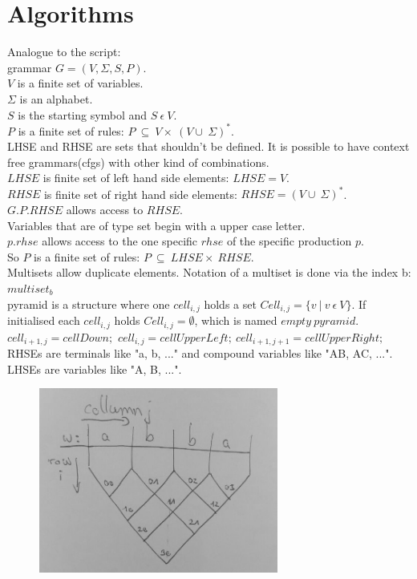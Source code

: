 
\section{Algorithms}\label{algorithms}
\noindent Analogue to the script: \\
grammar $G=(V,\Sigma , S, P)$.\\
$V$ is a finite set of variables. \\
$\Sigma$ is an alphabet. \\
$S$ is the starting symbol and $S\ \epsilon\ V$. \\
$P$ is a finite set of rules: $P\ \subseteq\ V \times\ (V \cup\ \Sigma)^{*}$. \\ 
LHSE and RHSE are sets that shouldn't be defined. It is possible to have context free grammars(cfgs) with other kind of combinations.\\
$LHSE$ is finite set of left hand side elements: $LHSE = V$.\\
$RHSE$ is finite set of right hand side elements: $RHSE = (V \cup\ \Sigma)^{*}$.\\
$G.P.RHSE$ allows access to $RHSE$.\\
Variables that are of type set begin with a upper case letter.\\
$p.rhse$ allows access to the one specific $rhse$ of the specific production $p$.\\
So $P$ is a finite set of rules: $P\ \subseteq\ LHSE \times\ RHSE$. \\
Multisets allow duplicate elements. Notation of a multiset is done via the index b: $multiset_b$\\
pyramid is a structure where one $cell_{i,j}$ holds a set  $Cell_{i,j} = \{v\ |\ v\ \epsilon\ V\}$. If initialised each $cell_{i,j}$ holds $Cell_{i,j} = \emptyset $, which is named $empty\ pyramid$. $cell_{i+1,j} = cellDown;$ $cell_{i,j} = cellUpperLeft;\ cell_{i+1,j+1} = cellUpperRight;  $ \\
RHSEs are terminals like "a, b, ..." and compound variables like "AB, AC, ...". \\
LHSEs are variables like "A, B, ...".\\


\begin{figure}[h]
	\centering
	\includegraphics[width=0.7\textwidth]{abb/DataStructurePyramid}
\end{figure}


